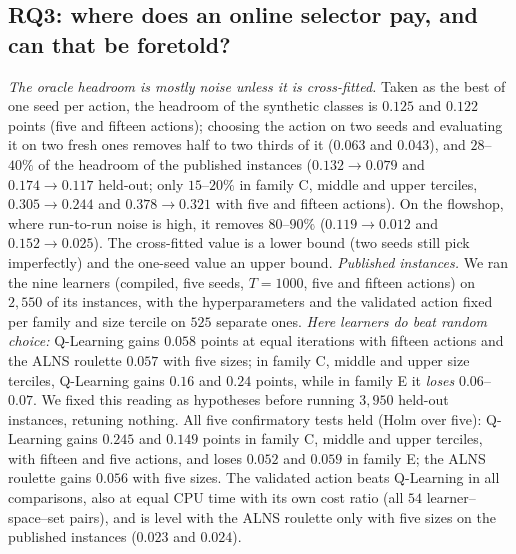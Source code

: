 \documentclass[conference,a4paper]{IEEEtran}
\begin{document}
\subsection{RQ3: where does an online selector pay, and can that be foretold?}
\label{sec:published}
\emph{The oracle headroom is mostly noise unless it is cross-fitted.} Taken as the best of one seed per action, the headroom of the synthetic classes is $0.125$ and $0.122$ points (five and fifteen actions); choosing the action on two seeds and evaluating it on two fresh ones removes half to two thirds of it ($0.063$ and $0.043$), and $28$--$40\%$ of the headroom of the published instances ($0.132\to0.079$ and $0.174\to0.117$ held-out; only $15$--$20\%$ in family C, middle and upper terciles, $0.305\to0.244$ and $0.378\to0.321$ with five and fifteen actions).
On the flowshop, where run-to-run noise is high, it removes $80$--$90\%$ ($0.119\to0.012$ and $0.152\to0.025$). The cross-fitted value is a lower bound (two seeds still pick imperfectly) and the one-seed value an upper bound.
\emph{Published instances.} We ran the nine learners (compiled, five seeds, $T=1000$, five and fifteen actions) on $2{,}550$ of its instances, with the hyperparameters and the validated action fixed per family and size tercile on $525$ separate ones. \emph{Here learners do beat random choice:}
Q-Learning gains $0.058$ points at equal iterations with fifteen actions and the ALNS roulette $0.057$ with five sizes; in family C, middle and upper size terciles, Q-Learning gains $0.16$ and $0.24$ points, while in family E it \emph{loses} $0.06$--$0.07$.
We fixed this reading as hypotheses before running $3{,}950$ held-out instances, retuning nothing. All five confirmatory tests held (Holm over five): Q-Learning gains $0.245$ and $0.149$ points in family C, middle and upper terciles, with fifteen and five actions, and loses $0.052$ and $0.059$ in family E; the ALNS roulette gains $0.056$ with five sizes. The validated action beats Q-Learning in all comparisons, also at equal CPU time with its own cost ratio
(all $54$ learner--space--set pairs), and is level with the ALNS roulette only with five sizes on the published instances ($0.023$ and $0.024$).
\end{document}
